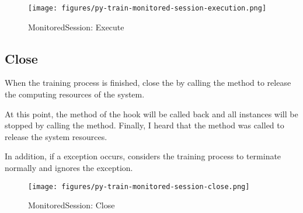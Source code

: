 \begin{content}
\begin{figure}[!htbp]
  \centering
  \texttt{[image: figures/py-train-monitored-session-execution.png]}
  \caption{MonitoredSession: Execute}
  \label{fig:py-train-monitored-session-execution}
\end{figure}


\subsection{Close}
When the training process is finished, close the  by calling the  method to release the computing resources of the system.

At this point, the  method of the hook will be called back and all  instances will be stopped by calling the  method. Finally, I heard that the  method was called to release the system resources.

In addition, if a  exception occurs,  considers the training process to terminate normally and ignores the exception.

\begin{figure}[!htbp]
  \centering
  \texttt{[image: figures/py-train-monitored-session-close.png]}
  \caption{MonitoredSession: Close}
  \label{fig:py-train-monitored-session-close}
\end{figure}

\end{content}


